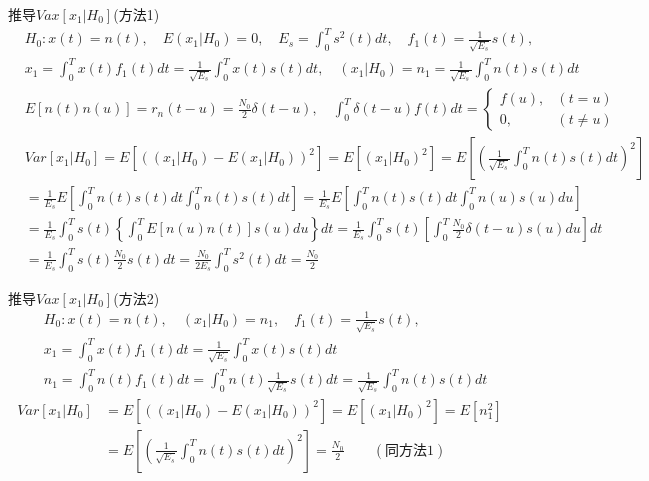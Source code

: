\begin{frame}[shrink]{推导$Vax[x_1|H_0]$(方法1)}
\begin{align*}
&H_0:x(t)=n(t),\quad E(x_1|H_0)=0,\quad E_s=\int_{0}^{T}s^2(t)dt,\quad f_1(t)=\frac{1}{\sqrt{E_s}}s(t),\\ &x_1=\int_{0}^{T}x(t)f_1(t)dt=\frac{1}{\sqrt{E_s}}\int_{0}^{T}x(t)s(t)dt,\quad (x_1|H_0)=n_1=\frac{1}{\sqrt{E_s}}\int_{0}^{T}n(t)s(t)dt\\
&E[n(t)n(u)]=r_n(t-u)=\frac{N_0}{2}\delta(t-u), \quad
\int_0^T\delta(t-u)f(t)dt=
\begin{cases}
f(u), & (t=u)\\
0, & (t\ne u) 
\end{cases}
\end{align*}
\begin{align*}
&Var[x_1|H_0]=E[((x_1|H_0)-E(x_1|H_0))^2]=E[(x_1|H_0)^2]=E\left[\left(\frac{1}{\sqrt{E_s}}\int_{0}^{T}n(t)s(t)dt\right)^2\right]\\
&=\frac{1}{E_s}E\left[\int_{0}^{T}n(t)s(t)dt\int_{0}^{T}n(t)s(t)dt\right]=\frac{1}{E_s}E\left[\int_{0}^{T}n(t)s(t)dt\int_{0}^{T}n(u)s(u)du\right]\\
&=\frac{1}{E_s}\int_{0}^{T}s(t)\left\{\int_{0}^{T}E[n(u)n(t)]s(u)du\right\}dt=\frac{1}{E_s}\int_{0}^{T}s(t)\left[\int_{0}^{T}\frac{N_0}{2}\delta(t-u)s(u)du\right]dt\\
&=\frac{1}{E_s}\int_{0}^{T}s(t)\frac{N_0}{2}s(t)dt=\frac{N_0}{2E_s}\int_{0}^{T}s^2(t)dt=\frac{N_0}{2}
\end{align*}
\end{frame}

\begin{frame}[shrink]{推导$Vax[x_1|H_0]$(方法2)}
\begin{align*}
&H_0: x(t)=n(t),\quad (x_1|H_0)=n_1,\quad f_1(t)=\frac{1}{\sqrt{E_s}}s(t),\\ &x_1=\int_{0}^{T}x(t)f_1(t)dt=\frac{1}{\sqrt{E_s}}\int_{0}^{T}x(t)s(t)dt\\
&n_1=\int_{0}^{T}n(t)f_1(t)dt=\int_{0}^{T}n(t)\frac{1}{\sqrt{E_s}}s(t)dt=\frac{1}{\sqrt{E_s}}\int_{0}^{T}n(t)s(t)dt
\end{align*}
\begin{align*}
Var[x_1|H_0]&=E[((x_1|H_0)-E(x_1|H_0))^2]=E[(x_1|H_0)^2]=E[n_1^2]\\
&=E\left[\left(\frac{1}{\sqrt{E_s}}\int_{0}^{T}n(t)s(t)dt\right)^2\right]=\frac{N_0}{2}\qquad (\text{同方法1})
\end{align*}
\end{frame}

